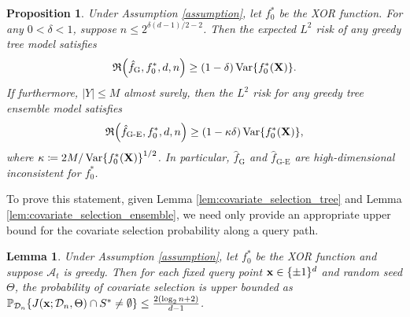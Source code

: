 \documentclass[11pt]{article}
\newtheorem{lemma}[theorem]{Lemma}
\newtheorem{proposition}[theorem]{Proposition}
\newcommand{\bx}{\mathbf{x}}
\newcommand{\bX}{\mathbf{X}}
\DeclarePairedDelimiter{\braces}{\lbrace}{\rbrace}
\DeclarePairedDelimiter{\paren}{(}{)}
\renewcommand{\P}{\mathbb{P}}
\newcommand{\Var}{\operatorname{Var}}
\newcommand{\binspace}{\braces{\pm 1}^\nfeats}
\newcommand{\sparsity}{s}
\newcommand{\nfeats}{d}
\newcommand{\nsamples}{n}
\newcommand{\data}[1][n]{\mathcal{D}_{#1}}
\newcommand{\suppset}{S^*}
\newcommand{\fgreedy}{\hat{f}_{\operatorname{G}}}
\newcommand{\alg}{\mathcal{A}}
\newcommand{\objective}{\mathfrak{R}}
\newcommand{\fgre}{\hat f_{\operatorname{G-E}}}
\newcommand{\ybound}{M}
\begin{document}
\begin{proposition}
\label{prop:xor_lower_bound}
Under Assumption \ref{assumption}, let $f_0^*$ be the XOR function.
    For any $0 < \delta < 1$,
    suppose $\nsamples \leq 2^{\delta(\nfeats-1)/2 - 2}$.
    Then the expected $L^2$ risk of any greedy tree model satisfies
    \begin{equation}
        \objective\paren*{\fgreedy, f^*_0,\nfeats,\nsamples} \geq (1-\delta)\Var\braces*{f_0^*(\bX)}.
    \end{equation}
    If furthermore, $|Y| \leq \ybound$ almost surely, then the $L^2$ risk for any greedy tree ensemble model satisfies
    \begin{equation}
        \objective\paren*{\fgre, f^*_0,\nfeats,\nsamples} \geq (1-\kappa\delta)\Var\braces*{f_0^*(\bX)},
    \end{equation}
    where $\kappa \coloneqq 2\ybound/\Var\braces*{f_0^*(\bX)}^{1/2}$.
    In particular, $\fgreedy$ and $\fgre$ are high-dimensional inconsistent for $f^*_0$.
\end{proposition}

To prove this statement, given Lemma \ref{lem:covariate_selection_tree} and Lemma \ref{lem:covariate_selection_ensemble}, we need only provide an appropriate upper bound for the covariate selection probability along a query path.


\begin{lemma}
    \label{lem:xor_feature_selection_prob}
    Under Assumption \ref{assumption}, let $f_0^*$ be the XOR function and suppose $\alg_t$ is greedy.
    Then for each fixed query point $\bx \in \binspace$ and random seed $\Theta$, the probability of covariate selection is upper bounded as $\P_{\data}\braces*{J(\bx;\data,\Theta)\cap \suppset \neq \emptyset } \leq \frac{2(\log_2 \nsamples + 2)}{\nfeats - 1}$.
\end{lemma}
\end{document}
